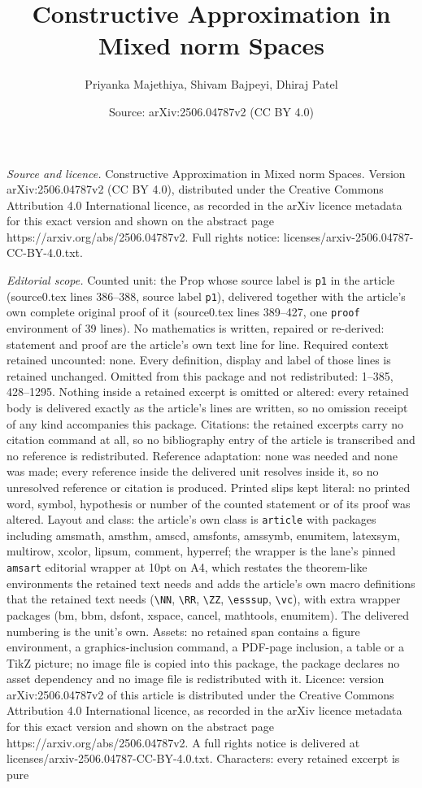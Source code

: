 \documentclass[10pt,a4paper]{amsart}
\title[Constructive Approximation in Mixed norm Spaces]{Constructive Approximation in Mixed norm Spaces}
\author{Priyanka Majethiya, Shivam Bajpeyi, Dhiraj Patel}
\date{Source: arXiv:2506.04787v2 (CC BY 4.0)}
\begin{document}
\maketitle

\noindent\emph{Source and licence.} Constructive Approximation in Mixed norm Spaces. Version arXiv:2506.04787v2 (CC BY 4.0), distributed under the Creative Commons Attribution 4.0 International licence, as recorded in the arXiv licence metadata for this exact version and shown on the abstract page https://arxiv.org/abs/2506.04787v2. Full rights notice: licenses/arxiv-2506.04787-CC-BY-4.0.txt.\par\smallskip

\noindent\textit{Editorial scope.} Counted unit: the Prop whose source label is \texttt{p1} in the article (source0.tex lines 386--388, source label \texttt{p1}), delivered together with the article's own complete original proof of it (source0.tex lines 389--427, one \texttt{proof} environment of 39 lines). No mathematics is written, repaired or re-derived: statement and proof are the article's own text line for line. Required context retained uncounted: none. Every definition, display and label of those lines is retained unchanged. Omitted from this package and not redistributed: 1--385, 428--1295. Nothing inside a retained excerpt is omitted or altered: every retained body is delivered exactly as the article's lines are written, so no omission receipt of any kind accompanies this package. Citations: the retained excerpts carry no citation command at all, so no bibliography entry of the article is transcribed and no reference is redistributed. Reference adaptation: none was needed and none was made; every reference inside the delivered unit resolves inside it, so no unresolved reference or citation is produced. Printed slips kept literal: no printed word, symbol, hypothesis or number of the counted statement or of its proof was altered. Layout and class: the article's own class is \texttt{article} with packages including amsmath, amsthm, amscd, amsfonts, amssymb, enumitem, latexsym, multirow, xcolor, lipsum, comment, hyperref; the wrapper is the lane's pinned \texttt{amsart} editorial wrapper at 10pt on A4, which restates the theorem-like environments the retained text needs and adds the article's own macro definitions that the retained text needs (\texttt{\textbackslash NN}, \texttt{\textbackslash RR}, \texttt{\textbackslash ZZ}, \texttt{\textbackslash esssup}, \texttt{\textbackslash vc}), with extra wrapper packages (bm, bbm, dsfont, xspace, cancel, mathtools, enumitem). The delivered numbering is the unit's own. Assets: no retained span contains a figure environment, a graphics-inclusion command, a PDF-page inclusion, a table or a TikZ picture; no image file is copied into this package, the package declares no asset dependency and no image file is redistributed with it. Licence: version arXiv:2506.04787v2 of this article is distributed under the Creative Commons Attribution 4.0 International licence, as recorded in the arXiv licence metadata for this exact version and shown on the abstract page https://arxiv.org/abs/2506.04787v2. A full rights notice is delivered at licenses/arxiv-2506.04787-CC-BY-4.0.txt. Characters: every retained excerpt is pure 
\end{document}

